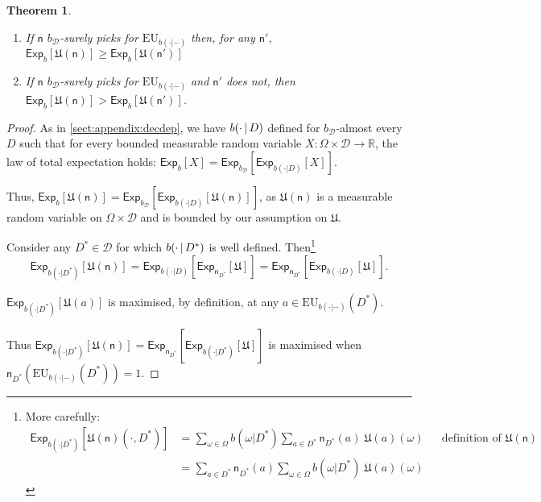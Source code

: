 \documentclass[a4paper]{article}
\newtheorem{theorem}{Theorem}
\newcommand\Exp{\mathsf{Exp}}
\newcommand\EU{\mathrm{EU}}
\newcommand\U{\mathfrak{U}} %
\newcommand{\D}{\mathcal{D}}
\newcommand{\Decs}{\mathcal{D}}
\newcommand{\n}{\mathsf{n}}
\renewcommand{\nu}{\n}
\renewcommand{\Re}{\mathbb{R}}
\renewcommand{\color}[1]{}
\newenvironment{colored}[1]{\leavevmode\color{#1}}{}
\newcommand\SetDelimiter[1][]{
	\nonscript\,#1\vert \allowbreak \nonscript\,\mathopen{}}
\providecommand\given{\SetDelimiter}
\renewcommand{\geq}{\geqslant}
\newenvironment{CCM rewritten}
{\begingroup\color{blue}} %
{\endgroup}              %
\begin{document}
\begin{colored}{violet}
\begin{theorem}\label{thm:EU appendix} 
	\hspace*{1mm}
	\begin{enumerate}[label=\normalfont(\roman*), ref=\roman*]
		\item  If $\n$ $b_\Decs$-surely picks for $\EU_{b(\cdot|-)}$ then, for any $\n'$, $\Exp_b[\U(\n)]\geq\Exp_b[\U(\n')]$
		\item  If $\n$ $b_\Decs$-surely picks for $\EU_{b(\cdot|-)}$ and $\n'$ does not, then $\Exp_b[\U(\n)]>\Exp_b[\U(\n')]$.
	\end{enumerate}
\end{theorem}
\begin{proof}


As in \cref{sect:appendix:decdep}, we have $b(\cdot\given D)$ defined for $b_\Decs$-almost every $D$ such that for every bounded measurable random variable $X:\Omega\times\Decs\to\Re$, the law of total expectation holds: $\Exp_b[X]=\Exp_{b_\Decs}[\Exp_{b(\cdot|D)}[X]]$.

Thus, $\Exp_{b}[\U(\n)]=\Exp_{b_\Decs}[\Exp_{b(\cdot | D)}[\U(\n)]]$, as $\U(\n)$ is a measurable random variable on $\Omega\times\Decs$ and is bounded by our assumption on $\U$. 


Consider any $D^*\in\D$ for which $b(\cdot\given D^*)$ is well defined. Then\footnote{More carefully:
	\begin{align}
		\Exp_{b(\cdot | D^*)}[\U(\n)(\cdot,D^*)]&=	\sum_{\omega\in\Omega}b(\omega| D^*)\sum_{a\in D^*}\n_{D^*}(a)\; \U(a)(\omega)&&\text{definition of $\U(\n)$}\\
		&=\sum_{a\in D^*}\n_{D^*}(a)\sum_{\omega\in\Omega}b(\omega| D^*)\;\U(a)(\omega)
\end{align}	}
 $$\Exp_{b(\cdot | D^*)}[\U(\n)]=\Exp_{b(\cdot | D)}[\Exp_{\nu_{D^*}}[\U]]=\Exp_{\nu_{D^*}}[\Exp_{b(\cdot | D)}[\U]].$$

$\Exp_{b(\cdot | D^*)}[\U(a)]$ is maximised, by definition, at any $a\in \EU_{b(\cdot|-)}(D^*)$. 

Thus $\Exp_{b(\cdot | D^*)}[\U(\n)]=\Exp_{\nu_{D^*}}[\Exp_{b(\cdot | D^*)}[\U]]$ is maximised when $\n_{D^*}(\EU_{b(\cdot|-)}(D^*))=1$. 


\end{proof}
\end{colored}
\end{document}
